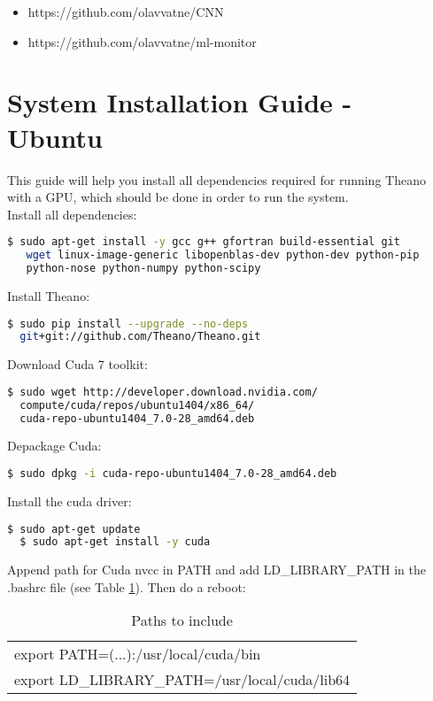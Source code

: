\begin{itemize}
\item https://github.com/olavvatne/CNN
\item https://github.com/olavvatne/ml-monitor
\end{itemize} 


\section{System Installation Guide - Ubuntu}
\label{app:ubuntuInstall}
This guide will help you install all dependencies required for running Theano with a GPU, which should be done in order to run the system. \\
\noindent Install all dependencies:
\begin{lstlisting}[language=bash]
  $ sudo apt-get install -y gcc g++ gfortran build-essential git
   wget linux-image-generic libopenblas-dev python-dev python-pip 
   python-nose python-numpy python-scipy  
\end{lstlisting}


\noindent Install Theano:
\begin{lstlisting}[language=bash]
  $ sudo pip install --upgrade --no-deps 
  git+git://github.com/Theano/Theano.git
\end{lstlisting}


\noindent Download Cuda 7 toolkit:
\begin{lstlisting}[language=bash]
  $ sudo wget http://developer.download.nvidia.com/
  compute/cuda/repos/ubuntu1404/x86_64/
  cuda-repo-ubuntu1404_7.0-28_amd64.deb
\end{lstlisting}


\noindent Depackage Cuda:
\begin{lstlisting}[language=bash]
  $ sudo dpkg -i cuda-repo-ubuntu1404_7.0-28_amd64.deb  
\end{lstlisting}


\noindent Install the cuda driver:
\begin{lstlisting}[language=bash]
  $ sudo apt-get update
  $ sudo apt-get install -y cuda  
\end{lstlisting}

\noindent Append path for Cuda nvcc in PATH and add LD\_LIBRARY\_PATH in the .bashrc file (see Table \ref{tab:install_bash_paths}). Then do a reboot:

\FloatBarrier
\begin{table}[!htbp]
\caption{Paths to include}
\begin{center}
\begin{adjustbox}{max width=\textwidth}
\begin{tabular}{ l }
  \hline			
  export PATH=(...):/usr/local/cuda/bin  \\
  export LD\_LIBRARY\_PATH=/usr/local/cuda/lib64 \\
  \hline  
\end{tabular}
\end{adjustbox}
\end{center}
\label{tab:install_bash_paths}
\end{table}
\FloatBarrier

